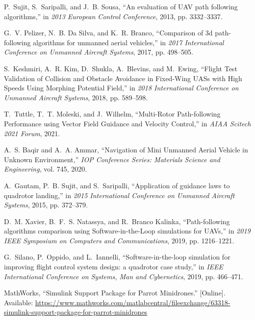 \documentclass[a4paper,twocolumn,10pt]{article}
\begin{document}
\begin{thebibliography}{10}
        P.~{Sujit}, S.~{Saripalli}, and J.~B. {Sousa}, ``{An evaluation of UAV path
        following algorithms},'' in \emph{2013 European Control Conference}, 2013,
        pp. 3332--3337.

        G.~V. {Pelizer}, N.~B. {Da Silva}, and K.~R. {Branco}, ``{Comparison of 3d
        path-following algorithms for unmanned aerial vehicles},'' in \emph{2017
        International Conference on Unmanned Aircraft Systems}, 2017, pp. 498--505.

        S.~{Keshmiri}, A.~R. {Kim}, D.~{Shukla}, A.~{Blevins}, and M.~{Ewing},
        ``{Flight Test Validation of Collision and Obstacle Avoidance in Fixed-Wing
        UASs with High Speeds Using Morphing Potential Field},'' in \emph{2018
        International Conference on Unmanned Aircraft Systems}, 2018, pp. 589--598.

        T.~{Tuttle}, T.~T. {Moleski}, and J.~{Wilhelm}, ``{Multi-Rotor Path-following
        Performance using Vector Field Guidance and Velocity Control},'' in
        \emph{AIAA Scitech 2021 Forum}, 2021.

        A.~S. {Baqir} and A.~A. {Ammar}, ``{Navigation of Mini Unmanned Aerial Vehicle
        in Unknown Environment},'' \emph{IOP Conference Series: Materials Science and
        Engineering}, vol. 745, 2020.

        A.~{Gautam}, P.~B. {Sujit}, and S.~{Saripalli}, ``{Application of guidance laws
        to quadrotor landing},'' in \emph{2015 International Conference on Unmanned
        Aircraft Systems}, 2015, pp. 372--379.

        D.~M. {Xavier}, B.~F.~S. {Natassya}, and R.~{Branco Kalinka}, ``{Path-following
        algorithms comparison using Software-in-the-Loop simulations for UAVs},'' in
        \emph{2019 IEEE Symposium on Computers and Communications}, 2019, pp.
        1216--1221.

        G.~{Silano}, P.~{Oppido}, and L.~{Iannelli}, ``{Software-in-the-loop simulation
        for improving flight control system design: a quadrotor case study},'' in
        \emph{IEEE International Conference on Systems, Man and Cybernetics}, 2019,
        pp. 466--471.

        {MathWorks}, ``{Simulink Support Package for Parrot Minidrones}.'' [Online].
        Available:
        \url{https://www.mathworks.com/matlabcentral/fileexchange/63318-simulink-support-package-for-parrot-minidrones}


\end{thebibliography}
\end{document}
